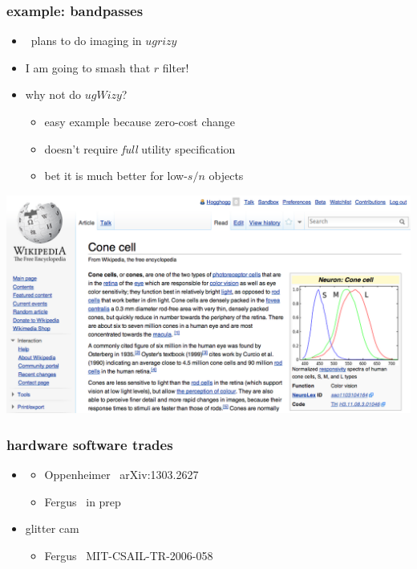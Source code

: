 \documentclass[pdftex]{beamer}
\begin{document}
\begin{frame}
  \frametitle{example: bandpasses}
  \begin{itemize}
  \item \lsst\ plans to do imaging in $ugrizy$
  \item I am going to smash that $r$ filter!
  \item why not do $ugWizy$?
    \begin{itemize}
    \item easy example because zero-cost change
    \item doesn't require \emph{full} utility specification
    \item bet it is much better for low-$s/n$ objects
    \end{itemize}
  \end{itemize}
\end{frame}

\begin{frame}
\includegraphics[width=\textwidth]{conecell.png}
\end{frame}

\begin{frame}
  \frametitle{hardware  software trades}
  \begin{itemize}
  \item {}
    \begin{itemize}
    \item Oppenheimer \etal\ arXiv:1303.2627
    \item Fergus \etal\ in prep
    \end{itemize}
  \item glitter cam
    \begin{itemize}
    \item Fergus \etal\ MIT-CSAIL-TR-2006-058
    \end{itemize}
  \end{itemize}
\end{frame}
\end{document}
